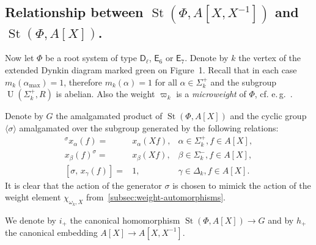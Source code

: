 \documentclass[oneside, 10pt]{amsart}
\DeclareMathOperator{\St}{St}
\DeclareMathOperator{\UU}{U}
\newcommand{\rD}{\mathsf{D}}
\newcommand{\rE}{\mathsf{E}}
\newcommand{\inv}{^{-1}}
\numberwithin{equation}{section}
\numberwithin{thm}{section}
\numberwithin{lemma}{section}
\theoremstyle{definition}
\theoremstyle{remark}
\begin{document}
\subsection{Relationship between $\St(\Phi, A[X, X\inv])$ and $\St(\Phi, A[X])$.} \label{subsec:short-presentation}
Now let $\Phi$ be a root system of type $\rD_\ell$, $\rE_6$ or $\rE_7$.
Denote by $k$ the vertex of the extended Dynkin diagram marked green on Figure~1.
Recall that in each case $m_k(\alpha_\mathrm{\max}) = 1$, therefore $m_k(\alpha) = 1$ for all $\alpha \in \Sigma_k^+$ and the subgroup $\UU(\Sigma^+_k, R)$ is abelian.
Also the weight $\varpi_k$ is a \textit{microweight} of $\Phi$, cf. e.\,g.~\cite[\S~2]{Ge17}.

Denote by $G$ the amalgamated product of $\St(\Phi, A[X])$ and the cyclic group $\langle \sigma \rangle$ amalgamated over the subgroup generated by the following relations:
\begin{align}
{}^\sigma x_{\alpha}(f) = & x_{\alpha} (Xf), & \alpha \in \Sigma^+_k, f \in A[X], \label{eq:sigma-sigma-plus} \\
x_{\beta}(f)^ \sigma     =& x_{\beta} (Xf), & \beta \in \Sigma^-_k, f \in A[X], \label{eq:sigma-sigma-minus} \\
[\sigma,\, x_\gamma(f)]   =& 1, & \gamma \in \Delta_k, f \in A[X]. \label{eq:sigma-delta}
\end{align}
It is clear that the action of the generator $\sigma$ is chosen to mimick the action of the weight element $\chi_{\omega_k, X}$ from~\cref{subsec:weight-automorphisms}.

We denote by $i_+$ the canonical homomorphism $\St(\Phi, A[X]) \to G$ and by $h_+$ the canonical embedding $A[X] \to A[X, X\inv]$.
\end{document}
